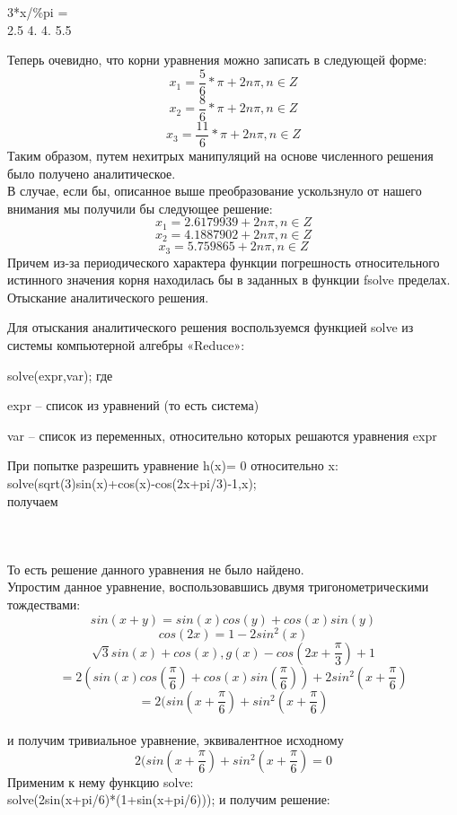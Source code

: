 \documentclass[russian,utf8,nocolumnxxxi,nocolumnxxxii]{eskdtext}
\begin{document}
3*x/\%pi =
\\2.5 4. 4. 5.5

\newpage
Теперь очевидно, что корни уравнения можно записать в следующей форме:
$$x_1=\frac{5}{6}*\pi+2n\pi,n\in Z$$
$$x_2=\frac{8}{6}*\pi+2n\pi,n\in Z$$
$$x_3=\frac{11}{6}*\pi+2n\pi,n\in Z$$
Таким образом, путем нехитрых манипуляций на основе численного решения было получено аналитическое.\\
В случае, если бы, описанное выше преобразование ускользнуло от нашего внимания мы получили бы следующее решение:
$$x_1=2.6179939+2n\pi,n\in Z$$
$$x_2=4.1887902+2n\pi,n\in Z$$
$$x_3=5.759865+2n\pi,n\in Z$$
Причем из-за периодического характера функции погрешность относительного истинного значения корня находилась бы в заданных в функции fsolve пределах.
\newpage
Отыскание аналитического решения.

Для отыскания аналитического решения воспользуемся функцией solve из системы компьютерной алгебры «Reduce»:

solve(expr,var); где

expr – список из уравнений (то есть система)

var – список из переменных, относительно которых решаются уравнения expr

При попытке разрешить уравнение h(x)= 0 относительно x:\\
solve(sqrt(3)sin(x)+cos(x)-cos(2x+pi/3)-1,x);\\
получаем
\begin{figure}[H]
\begin{center}
\begin{minipage}[h]{0.65\linewidth}
  \\
\frametitle{}
\end{minipage}
\end{center}
\end{figure}

То есть решение данного уравнения не было найдено.\\
Упростим данное уравнение, воспользовавшись двумя тригонометрическими тождествами: $$sin(x+y)=sin(x)cos(y)+cos(x)sin(y)$$
$$cos(2x)=1-2sin^2(x) $$
$$\sqrt{3}sin(x)+cos(x),g(x)-cos(2x+\frac{\pi}{3})+1$$ $$=2(sin(x)cos(\frac{\pi}{6})+cos(x)sin(\frac{\pi}{6}))+2sin^2(x+\frac{\pi}{6})$$ $$=2(sin(x+\frac{\pi}{6})+sin^2(x+\frac{\pi}{6})$$\\
и получим тривиальное уравнение, эквивалентное исходному
$$2(sin(x+\frac{\pi}{6})+sin^2(x+\frac{\pi}{6})=0$$
Применим к нему функцию solve:\\
solve(2sin(x+pi/6)*(1+sin(x+pi/6)));
и получим решение:
\newpage
\end{document}
